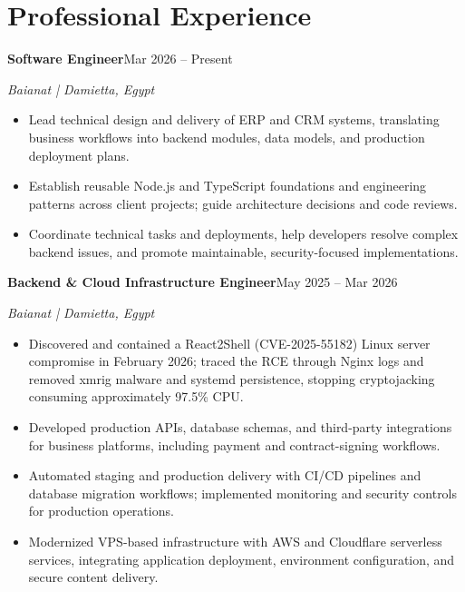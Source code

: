\documentclass[a4paper,10pt]{article}
\newcommand{\role}[4]{\textbf{#1}\hfill #2\par\textit{#3 | #4}\par}
\begin{document}
\section{Professional Experience}
\role{Software Engineer}{Mar 2026 -- Present}{Baianat}{Damietta, Egypt}
\begin{itemize}
\item Lead technical design and delivery of ERP and CRM systems, translating business workflows into backend modules, data models, and production deployment plans.
\item Establish reusable Node.js and TypeScript foundations and engineering patterns across client projects; guide architecture decisions and code reviews.
\item Coordinate technical tasks and deployments, help developers resolve complex backend issues, and promote maintainable, security-focused implementations.
\end{itemize}

\role{Backend \& Cloud Infrastructure Engineer}{May 2025 -- Mar 2026}{Baianat}{Damietta, Egypt}
\begin{itemize}
\item Discovered and contained a React2Shell (CVE-2025-55182) Linux server compromise in February 2026; traced the RCE through Nginx logs and removed xmrig malware and systemd persistence, stopping cryptojacking consuming approximately 97.5\% CPU.
\item Developed production APIs, database schemas, and third-party integrations for business platforms, including payment and contract-signing workflows.
\item Automated staging and production delivery with CI/CD pipelines and database migration workflows; implemented monitoring and security controls for production operations.
\item Modernized VPS-based infrastructure with AWS and Cloudflare serverless services, integrating application deployment, environment configuration, and secure content delivery.
\end{itemize}
\end{document}
